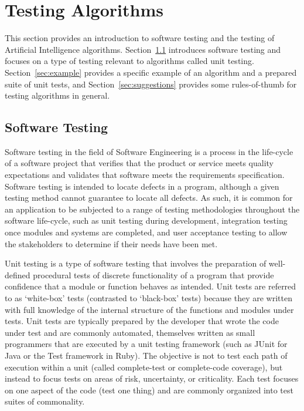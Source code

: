 
\section{Testing Algorithms} 
\label{advanced:sec:testing_algorithms}

This section provides an introduction to software testing and the testing of Artificial Intelligence algorithms. Section~\ref{sec:testing} introduces software testing and focuses on a type of testing relevant to algorithms called unit testing. Section~\ref{sec:example} provides a specific example of an algorithm and a prepared suite of unit tests, and Section~\ref{sec:suggestions} provides some rules-of-thumb for testing algorithms in general.


%
%
\subsection{Software Testing}
\label{sec:testing}
Software testing in the field of Software Engineering is a process in the life-cycle of a software project that verifies that the product or service meets quality expectations and validates that software meets the requirements specification. Software testing is intended to locate defects in a program, although a given testing method cannot guarantee to locate all defects. As such, it is common for an application to be subjected to a range of testing methodologies throughout the software life-cycle, such as unit testing during development, integration testing once modules and systems are completed, and user acceptance testing to allow the stakeholders to determine if their needs have been met.

Unit testing is a type of software testing that involves the preparation of well-defined procedural tests of discrete functionality of a program that provide confidence that a module or function behaves as intended. Unit tests are referred to as `white-box' tests (contrasted to `black-box' tests) because they are written with full knowledge of the internal structure of the functions and modules under tests. Unit tests are typically prepared by the developer that wrote the code under test and are commonly automated, themselves written as small programmers that are executed by a unit testing framework (such as JUnit for Java or the Test framework in Ruby). The objective is not to test each path of execution within a unit (called complete-test or complete-code coverage), but instead to focus tests on areas of risk, uncertainty, or criticality. Each test focuses on one aspect of the code (test one thing) and are commonly organized into test suites of commonality. 

